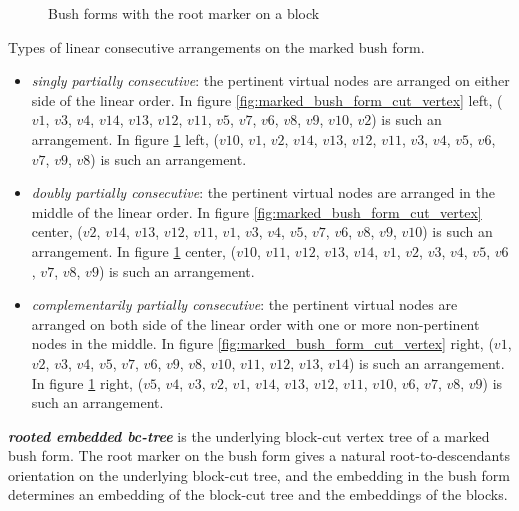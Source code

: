 \documentclass[a4]{jgaa-art}
\newenvironment{definition}[1][Definition]{\begin{trivlist}
\item[\hskip \labelsep {\bfseries #1}]}{\end{trivlist}}
\begin{document}
\begin{figure}[!htb]
\begin{minipage}[b]{0.3\textwidth}
  \end{minipage}
  \caption{Bush forms with the root marker on a block}\label{fig:marked_bush_form_block}
\end{figure}


\begin{definition}
Types of linear consecutive arrangements on the marked bush form.
\begin{itemize}
\item {\it singly partially consecutive}: the pertinent virtual nodes are arranged 
on either side of the linear order.
In figure \ref{fig:marked_bush_form_cut_vertex} left, 
($v1$, $v3$, $v4$, $v14$, $v13$, $v12$, $v11$, $v5$, $v7$, $v6$, $v8$, $v9$, $v10$, $v2$) is such an arrangement.
In figure \ref{fig:marked_bush_form_block} left, 
($v10$, $v1$, $v2$, $v14$, $v13$, $v12$, $v11$, $v3$, $v4$, $v5$, $v6$, $v7$, $v9$, $v8$) is such an arrangement.

\item {\it doubly partially consecutive}: the pertinent virtual nodes are arranged 
in the middle of the linear order.
In figure \ref{fig:marked_bush_form_cut_vertex} center,
($v2$, $v14$, $v13$, $v12$, $v11$, $v1$, $v3$, $v4$, $v5$, $v7$, $v6$, $v8$, $v9$, $v10$) is such an arrangement.
In figure \ref{fig:marked_bush_form_block} center, 
($v10$, $v11$, $v12$, $v13$, $v14$, $v1$, $v2$, $v3$, $v4$, $v5$, $v6$, $v7$, $v8$, $v9$) is such an arrangement.

\item {\it complementarily partially consecutive}: the pertinent virtual nodes are arranged on both side of
the linear order with one or more non-pertinent nodes in the middle.
In figure \ref{fig:marked_bush_form_cut_vertex} right,
($v1$, $v2$, $v3$, $v4$, $v5$, $v7$, $v6$, $v9$, $v8$, $v10$, $v11$, $v12$, $v13$, $v14$) is such an arrangement.
In figure \ref{fig:marked_bush_form_block} right, 
($v5$, $v4$, $v3$, $v2$, $v1$, $v14$, $v13$, $v12$, $v11$, $v10$, $v6$, $v7$, $v8$, $v9$) is such an arrangement.

\end{itemize}
\end{definition}

\begin{definition}
{\bf \emph{rooted embedded bc-tree}} is the underlying block-cut vertex tree of a marked bush form.
The root marker on the bush form  gives a natural root-to-descendants orientation 
on the underlying block-cut tree, and the embedding in the bush form determines
 an embedding of the block-cut tree and the embeddings of the blocks.
\end{definition}
\end{document}

